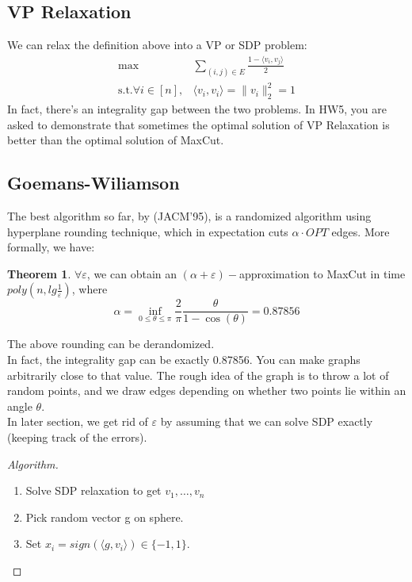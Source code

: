 \documentclass[11pt]{article}
\newcommand{\eps}{\epsilon}
\renewcommand{\epsilon}{\varepsilon}
\newcommand{\<}{\langle}
\renewcommand{\>}{\rangle}
\theoremstyle{definition}
\numberwithin{problem}{section}
\newtheorem{theorem}{Theorem}
\begin{document}
\subsection{VP Relaxation}
We can relax the definition above into a VP or SDP problem:
\begin{align*}
\text{max} &\sum_{(i,j) \in E} \frac{1-\<v_i, v_j\>}{2} \\
\text{s.t.} \forall i \in [n], &\<v_i, v_i\> = \|v_i\|_2^2 = 1
\end{align*}
In fact, there's an integrality gap between the two problems. In HW5, you are asked to demonstrate that sometimes the optimal solution of VP Relaxation is better than the optimal solution of MaxCut. 
\subsection{Goemans-Wiliamson}
The best algorithm so far, by (JACM'95), is a randomized algorithm using hyperplane rounding technique, which in expectation cuts $\alpha \cdot OPT$ edges. More formally, we have:
\begin{theorem}
$\forall \eps$, we can obtain an $(\alpha+\eps)-$approximation to MaxCut in time $poly(n, lg\frac{1}{\eps})$, where 
\[\alpha = \underset{0 \leq \theta \leq \pi}{\inf} \frac{2}{\pi}\frac{\theta}{1-\cos(\theta)} = 0.87856\]
\end{theorem}
The above rounding can be derandomized. \cite{derandomize}\\ 
In fact, the integrality gap can be exactly 0.87856. You can make graphs arbitrarily close to that value. The rough idea of the graph is to throw a lot of random points, and we draw edges depending on whether two points lie within an angle $\theta$. \cite{FeigeAndSchechtman}\\
In later section, we get rid of $\eps$ by assuming that we can solve SDP exactly (keeping track of the errors).
\begin{proof}[Algorithm]
\begin{enumerate}
	\item Solve SDP relaxation to get $v_1, \ldots, v_n$
    \item Pick random vector g on sphere.
    \item Set $x_i = sign(\<g, v_i\>) \in \{-1, 1\}$. 
\end{enumerate}
\end{proof}
\end{document}
